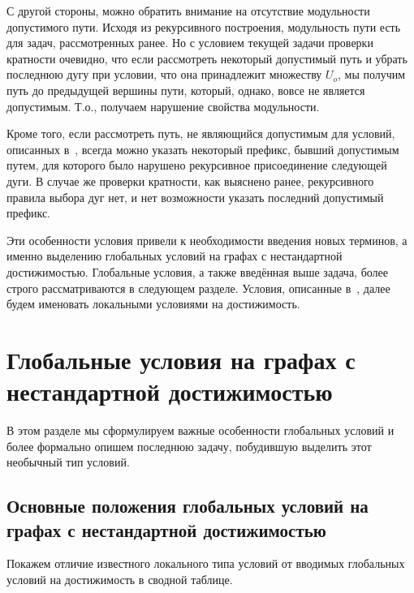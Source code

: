 	С другой стороны, можно обратить внимание на отсутствие модульности допустимого пути. Исходя из рекурсивного построения, модульность пути есть для задач, рассмотренных ранее. Но с условием текущей задачи проверки кратности очевидно, что если рассмотреть некоторый допустимый путь и убрать последнюю дугу при условии, что она принадлежит множеству $U_o$, мы получим путь до предыдущей вершины пути, который, однако, вовсе не является допустимым. Т.о., получаем нарушение свойства модульности. 
	
	Кроме того, если рассмотреть путь, не являющийся допустимым для условий, описанных в~\autocite{Mono}, всегда можно указать некоторый префикс, бывший допустимым путем, для которого было нарушено рекурсивное присоединение следующей дуги. В случае же проверки кратности, как выяснено ранее, рекурсивного правила выбора дуг нет, и нет возможности указать последний допустимый префикс.  
	
	Эти особенности условия привели к необходимости введения новых терминов, а именно выделению глобальных условий на графах с нестандартной достижимостью. Глобальные условия, а также введённая выше задача, более строго рассматриваются в следующем разделе. Условия, описанные в~\autocite{Mono}, далее будем именовать локальными условиями на достижимость.
	
	\section{Глобальные условия на графах с нестандартной достижимостью}
	
 	В этом разделе мы сформулируем важные особенности глобальных условий и более формально опишем последнюю задачу, побудившую выделить этот необычный тип условий. 
	
	\subsection{Основные положения глобальных условий на графах с нестандартной достижимостью}
	
	Покажем отличие известного локального типа условий от вводимых глобальных условий на достижимость в сводной таблице.
	
